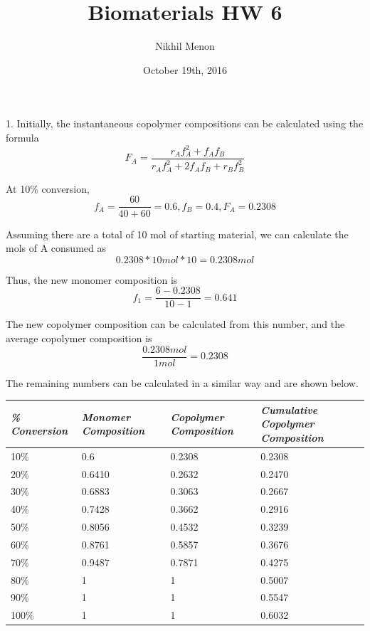 \documentclass{article}
\title{Biomaterials HW 6}
\author{Nikhil Menon}
\date{October 19th, 2016}
\begin{document}
\maketitle

1. Initially, the instantaneous copolymer compositions can be calculated using the formula
$$F_A=\frac{r_Af_A^2+f_Af_B}{r_Af_A^2+2f_Af_B+r_Bf_B^2}$$

At 10\% conversion, 
$$f_A=\frac{60}{40+60}=0.6,f_B=0.4,F_A=0.2308$$

Assuming there are a total of 10 mol of starting material, we can calculate the mols of A consumed as
$$0.2308*10 mol*10=0.2308 mol$$

Thus, the new monomer composition is
$$f_1=\frac{6-0.2308}{10-1}=0.641$$

The new copolymer composition can be calculated from this number, and the average copolymer composition is $$\frac{0.2308 mol}{1 mol}=0.2308$$

The remaining numbers can be calculated in a similar way and are shown below.


\begin{tabular}{*4l}    \toprule
\emph{\% Conversion} & \emph{Monomer Composition} & \emph{Copolymer Composition} & \emph{Cumulative Copolymer Composition} \\
\midrule
10\% & 0.6 & 0.2308 & 0.2308\\ 
20\% & 0.6410 & 0.2632 & 0.2470\\
30\% & 0.6883 & 0.3063 & 0.2667\\
40\% & 0.7428 & 0.3662 & 0.2916\\
50\% & 0.8056 & 0.4532 & 0.3239\\
60\% & 0.8761 & 0.5857 & 0.3676\\
70\% & 0.9487 & 0.7871 & 0.4275\\
80\% & 1 & 1 & 0.5007\\
90\% & 1 & 1 & 0.5547\\
100\% & 1 & 1 & 0.6032\\
\bottomrule
\end{tabular}
\end{document}
